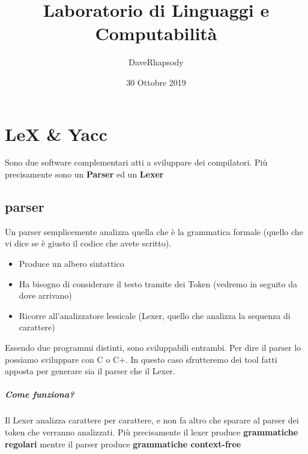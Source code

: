 \documentclass[12pt, a4paper, openany, twoside]{book}
\begin{document}
\selectfont
\pagestyle{plain}
\author{DaveRhapsody}
\title {Laboratorio di Linguaggi e Computabilità}
\date {30 Ottobre 2019}
\maketitle
\tableofcontents
\chapter{LeX \& Yacc}
Sono due software complementari atti a sviluppare dei compilatori. Più precisamente
sono un \textbf{Parser} ed un \textbf{Lexer}
\section{parser}
Un parser semplicemente analizza quella che è la grammatica formale (quello che
vi dice se è giusto il codice che avete scritto). 
\begin{itemize}
	\item Produce un albero sintattico
	\item Ha bisogno di considerare il testo tramite dei Token (vedremo in seguito
	da dove arrivano)
	\item Ricorre all'analizzatore lessicale (Lexer, quello che analizza la 
	sequenza di carattere)
\end{itemize}
Essendo due programmi distinti, sono sviluppabili entrambi. Per dire il parser
lo possiamo sviluppare con C o C+.
In questo caso sfrutteremo dei tool fatti apposta per generare sia il parser che
il Lexer.
\paragraph{Come funziona?}
Il Lexer analizza carattere per carattere, e non fa altro che sparare al parser
dei token che verranno analizzati. Più precisamente il lexer produce \textbf{
grammatiche regolari
} mentre il parser produce \textbf{grammatiche context-free} 
\end{document}

